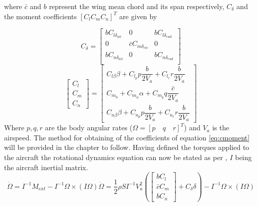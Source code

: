 where $\bar{c}$ and $b$ represent the wing mean chord and its span respectively, $C_\delta$ and the moment coefficients $[C_l C_m C_n]^T$ are given by

\begin{equation}
C_\delta = 
\begin{bmatrix}
bC_{l\delta_{ail}} & 0 & bC_{l\delta_{rud}} \\
0 & \bar{c}C_{m\delta_{ele}} & 0 \\
bC_{n\delta_{ail}} & 0 & bC_{n\delta_{rud}}\\
\end{bmatrix}
\label{eq:cdelta}
\end{equation}
\begin{equation}
\begin{bmatrix}
C_l\\
C_m\\
C_n
\end{bmatrix} 
=
\begin{bmatrix}
C_{l\beta} \beta + C_{l_p} p \dfrac{b}{2V_a} + C_{l_r} r \dfrac{b}{2V_a}\\
C_{m_0} + C_{m_\alpha} \alpha + C_{m_q} q \dfrac{\bar{c}}{2V_a}\\
C_{n\beta} \beta + C_{n_p} p \dfrac{b}{2V_a} + C_{n_r} r \dfrac{b}{2V_a}
\end{bmatrix}
\label{eq:cmoment}
\end{equation}
Where $p, q, r$ are the body angular rates ($\Omega = [p\quad q\quad  r]^T$) and $V_a$ is the airspeed. The method for obtaining of the coefficients of equation \ref{eq:cmoment} will be provided in the chapter to follow. Having defined the torques applied to the aircraft the rotational dynamics equation can now be stated as per \cite{hector}, $I$ being the aircraft inertial matrix.
\begin{subequations}
	\begin{equation}
		\dot{\Omega} = I^{-1} M_{ext} - I^{-1}\Omega \times (I\Omega)
	\end{equation}
	\begin{equation}
		\dot{\Omega} = 
		\dfrac{1}{2}\rho S I^{-1} V_a^2\left(
		\begin{bmatrix}
			bC_l\\
			\bar{c}C_m\\
			bC_n
		\end{bmatrix}
		+ C_\delta \delta\right)
		- I^{-1}\Omega \times (I\Omega)	
	\end{equation}

\label{eq:fast_dynamics}
\end{subequations}

